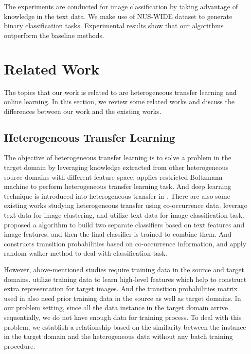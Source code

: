 \documentclass{article} %
\theoremstyle{remark}
\theoremstyle{definition}
\begin{document}
The experiments are conducted for image classification by taking advantage of knowledge in the text data.
We make use of NUS-WIDE dataset to generate binary classification tasks.
Experimental results show that our algorithms outperform the baseline methods.

\section{Related Work}

The topics that our work is related to are heterogeneous transfer learning and online learning.
In this section, we review some related works and discuss the differences between our work and the existing works.

\subsection{Heterogeneous Transfer Learning}
The objective of heterogeneous transfer learning is to solve a problem in the target domain by leveraging knowledge extracted from other heterogeneous source domains with different feature space.
\cite{wei2011heterogeneous} applies restricted Boltzmann machine to perform heterogeneous transfer learning task.
And deep learning technique is introduced into heterogeneous transfer in \cite{zhou2014hybrid}.
There are also some existing works studying heterogeneous transfer using co-occurrence data.
\cite{yang2009heterogeneous} leverage text data for image clustering, and \cite{zhu2011heterogeneous} utilize text data for image classification task.
\cite{wang2009building} proposed a algorithm to build two separate classifiers based on text features and image features, and then the final classifier is trained to combine them.
And \cite{ng2012co,wu2014co,tan2014mixed} constructs transition probabilities based on co-occurrence information, and apply random walker method to deal with classification task.

However, above-mentioned studies require training data in the source and target domains.
\cite{zhu2011heterogeneous} utilize training data to learn high-level features which help to construct extra representation for target images.
And the transition probabilities matrix used in \cite{ng2012co,wu2014co} also need prior training data in the source as well as target domains.
In our problem setting, since all the data instance in the target domain arrive sequentially, we do not have enough data for training process.
To deal with this problem, we establish a relationship based on the similarity between the instance in the target domain and the heterogeneous data without any batch training procedure.
\end{document}
